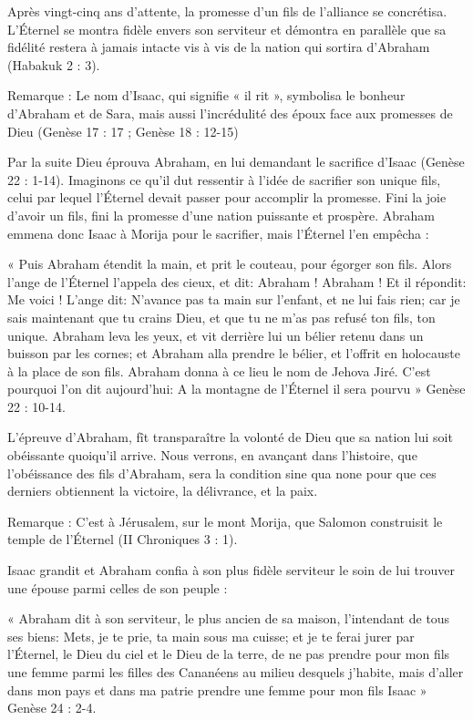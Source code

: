 Après vingt-cinq ans d'attente, la promesse d'un fils de l'alliance se concrétisa. L’Éternel se montra fidèle envers son serviteur et démontra en parallèle que sa fidélité restera à jamais intacte vis à vis de la nation qui sortira d'Abraham (Habakuk 2 : 3).

Remarque : Le nom d'Isaac, qui signifie « il rit », symbolisa le bonheur d'Abraham et de Sara, mais aussi l'incrédulité des époux face aux promesses de Dieu (Genèse 17 : 17 ; Genèse 18 : 12-15)

Par la suite Dieu éprouva Abraham, en lui demandant le sacrifice d'Isaac (Genèse 22 : 1-14). Imaginons ce qu'il dut ressentir à l'idée de sacrifier son unique fils, celui par lequel l’Éternel devait passer pour accomplir la promesse. Fini la joie d'avoir un fils, fini la promesse d'une nation puissante et prospère. Abraham emmena donc Isaac à Morija pour le sacrifier, mais l’Éternel l'en empêcha :

« Puis Abraham étendit la main, et prit le couteau, pour égorger son fils. Alors l'ange de l'Éternel l'appela des cieux, et dit: Abraham ! Abraham ! Et il répondit: Me voici ! L'ange dit: N'avance pas ta main sur l'enfant, et ne lui fais rien; car je sais maintenant que tu crains Dieu, et que tu ne m'as pas refusé ton fils, ton unique. Abraham leva les yeux, et vit derrière lui un bélier retenu dans un buisson par les cornes; et Abraham alla prendre le bélier, et l'offrit en holocauste à la place de son fils. Abraham donna à ce lieu le nom de Jehova Jiré. C'est pourquoi l'on dit aujourd'hui: A la montagne de l'Éternel il sera pourvu » Genèse 22 : 10-14.

L'épreuve d'Abraham, fît transparaître la volonté de Dieu que sa nation lui soit obéissante quoiqu'il arrive. Nous verrons, en avançant dans l'histoire, que l'obéissance des fils d'Abraham, sera la condition sine qua none pour que ces derniers obtiennent la victoire, la délivrance, et la paix.

Remarque : C'est à Jérusalem, sur le mont Morija, que Salomon construisit le temple de l’Éternel (II Chroniques 3 : 1).

Isaac grandit et Abraham confia à son plus fidèle serviteur le soin de lui trouver une épouse parmi celles de son peuple :

« Abraham dit à son serviteur, le plus ancien de sa maison, l'intendant de tous ses biens: Mets, je te prie, ta main sous ma cuisse; et je te ferai jurer par l'Éternel, le Dieu du ciel et le Dieu de la terre, de ne pas prendre pour mon fils une femme parmi les filles des Cananéens au milieu desquels j'habite, mais d'aller dans mon pays et dans ma patrie prendre une femme pour mon fils Isaac » Genèse 24 : 2-4.


